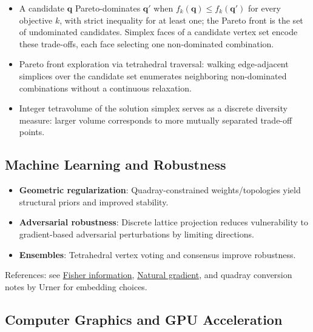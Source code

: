 \documentclass[
  10pt,
]{article}
\providecommand{\tightlist}{%
  \setlength{\itemsep}{0pt}\setlength{\parskip}{0pt}}
\begin{document}
\begin{itemize}
\tightlist
\item
  A candidate \(\mathbf{q}\) Pareto-dominates \(\mathbf{q}'\) when
  \(f_k(\mathbf{q}) \le f_k(\mathbf{q}')\) for every objective \(k\),
  with strict inequality for at least one; the Pareto front is the set
  of undominated candidates. Simplex faces of a candidate vertex set
  encode these trade-offs, each face selecting one non-dominated
  combination.
\item
  Pareto front exploration via tetrahedral traversal: walking
  edge-adjacent simplices over the candidate set enumerates neighboring
  non-dominated combinations without a continuous relaxation.
\item
  Integer tetravolume of the solution simplex serves as a discrete
  diversity measure: larger volume corresponds to more mutually
  separated trade-off points.
\end{itemize}

\subsection{Machine Learning and
Robustness}\label{machine-learning-and-robustness}

\begin{itemize}
\tightlist
\item
  \textbf{Geometric regularization}: Quadray-constrained
  weights/topologies yield structural priors and improved stability.
\item
  \textbf{Adversarial robustness}: Discrete lattice projection reduces
  vulnerability to gradient-based adversarial perturbations by limiting
  directions.
\item
  \textbf{Ensembles}: Tetrahedral vertex voting and consensus improve
  robustness.
\end{itemize}

References: see
\href{https://en.wikipedia.org/wiki/Fisher_information}{Fisher
information},
\href{https://en.wikipedia.org/wiki/Natural_gradient}{Natural gradient},
and quadray conversion notes by Urner for embedding choices.

\subsection{Computer Graphics and GPU
Acceleration}\label{computer-graphics-and-gpu-acceleration}
\end{document}
